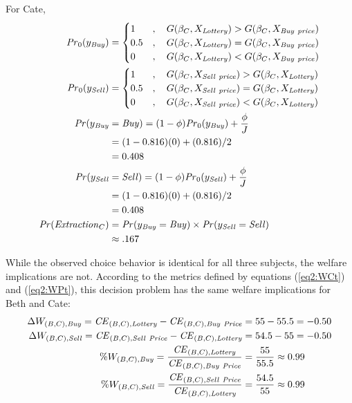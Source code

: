 \documentclass[../main.tex]{subfiles}
\begin{document}
\noindent For Cate,
\begin{align}
	\label{eq2:Cate}
	\begin{split}
		{\ensuremath{\mathit{Pr}}}_0(y_{\mathit{Buy}}) &=
		\begin{cases} 
			1 &, \quad G(\beta_C,X_{\mathit{Lottery}}) > G(\beta_C,X_{\mathit{Buy\ price}})\\
			0.5 &, \quad G(\beta_C,X_{\mathit{Lottery}}) = G(\beta_C,X_{\mathit{Buy\ price}})\\
			0 &, \quad G(\beta_C,X_{\mathit{Lottery}}) < G(\beta_C,X_{\mathit{Buy\ price}})
		\end{cases} \\
		{\mathit{Pr}}_0(y_{\mathit{Sell}}) &= 
		\begin{cases} 
			1 &, \quad G(\beta_C,X_{\mathit{Sell\ price}}) > G(\beta_C,X_{\mathit{Lottery}})\\
			0.5 &, \quad G(\beta_C,X_{\mathit{Sell\ price}}) = G(\beta_C,X_{\mathit{Lottery}})\\
			0 &, \quad G(\beta_C,X_{\mathit{Sell\ price}}) < G(\beta_C,X_{\mathit{Lottery}})
		\end{cases}\\
		{\mathit{Pr}}(y_{\mathit{Buy}}&=\mathit{Buy}) = (1-\phi) {\mathit{Pr}}_0(y_{\mathit{Buy}}) + \frac{\phi}{J}\\
		&=(1-0.816)(0) + (0.816)/2\\
		&=0.408\\
		{\mathit{Pr}}(y_{\mathit{Sell}}&=\mathit{Sell}) = (1-\phi) {\mathit{Pr}}_0(y_{\mathit{Sell}}) + \frac{\phi}{J}\\
		&=(1-0.816)(0) + (0.816)/2\\
		&=0.408\\
	{\mathit{Pr}}(\mathit{Extraction}_C) &= {\mathit{Pr}}(y_{\mathit{Buy}} = \mathit{Buy}) \times {\ensuremath{\mathit{Pr}}}(y_{\mathit{Sell}} = \mathit{Sell})\\
	&\approx .167
	\end{split}
\end{align}

While the observed choice behavior is identical for all three subjects, the welfare implications are not.
According to the metrics defined by equations (\ref{eq2:WCt}) and (\ref{eq2:WPt}), this decision problem has the same welfare implications for Beth and Cate:
\begin{align}
	\label{eq2:BCwelfare}
	\begin{split}
		\Delta W_{(B,C),\mathit{Buy}} = {\mathit{CE}}_{(B,C),\mathit{Lottery}} - {\mathit{CE}}_{(B,C),\mathit{Buy\ Price}} &= 55 - 55.5 = -0.50\\
		\Delta W_{(B,C),\mathit{Sell}} = {\mathit{CE}}_{(B,C),\mathit{Sell\ Price}} - {\mathit{CE}}_{(B,C),\mathit{Lottery}} &= 54.5 - 55 = -0.50\\
		\% W_{(B,C),\mathit{Buy}} = \frac{{\mathit{CE}}_{(B,C),\mathit{Lottery}}}{{\mathit{CE}}_{(B,C),\mathit{Buy\ Price}}} &= \frac{55}{55.5} \approx 0.99\\
		\% W_{(B,C),\mathit{Sell}} = \frac{{\mathit{CE}}_{(B,C),\mathit{Sell\ Price}}}{{\mathit{CE}}_{(B,C),\mathit{Lottery}}} &= \frac{54.5}{55} \approx 0.99
	\end{split}
\end{align}
\end{document}
